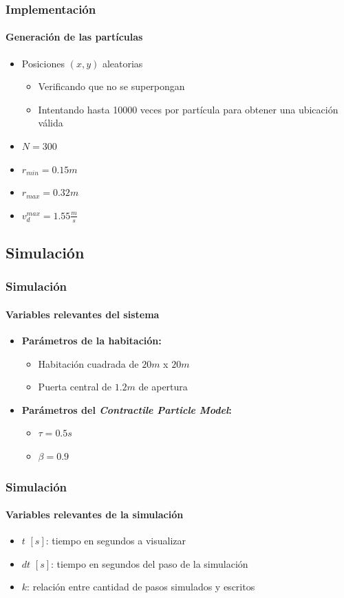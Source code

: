 \documentclass[hyperref={pdfpagelayout=SinglePage}]{beamer}
\begin{document}
\begin{frame}
\frametitle{Implementación}
\framesubtitle{Generación de las partículas}
\begin{itemize}
	\item Posiciones $(x,y)$ aleatorias
	\begin{itemize}
		\item Verificando que no se superpongan
		\item Intentando hasta 10000 veces por partícula para obtener una ubicación válida 
	\end{itemize}
	\item $N = 300$
	\item $r_{min} = 0.15m$
	\item $r_{max} = 0.32m$
	\item $v_{d}^{max} = 1.55 \frac{m}{s}$
\end{itemize}
\end{frame}

\subsection{Simulación}

\begin{frame}
\frametitle{Simulación}
\framesubtitle{Variables relevantes del sistema}
\begin{itemize}
	\item \textbf{Parámetros de la habitación:}
	\begin{itemize}
		\item Habitación cuadrada de $20m$ x $20m$
		\item Puerta central de $1.2m$ de apertura
	\end{itemize}
	\item \textbf{Parámetros del \textit{Contractile Particle Model}:}
	\begin{itemize}
		\item $\tau = 0.5s$
		\item $\beta = 0.9$
	\end{itemize}
\end{itemize}
\end{frame}

\begin{frame}
\frametitle{Simulación}
\framesubtitle{Variables relevantes de la simulación}
\begin{itemize}
	\item $t$ $[s]$: tiempo en segundos a visualizar
	\item $dt$ $[s]$: tiempo en segundos del paso de la simulación
	\item $k$: relación entre cantidad de pasos simulados y escritos
\end{itemize}
\end{frame}
\end{document}
